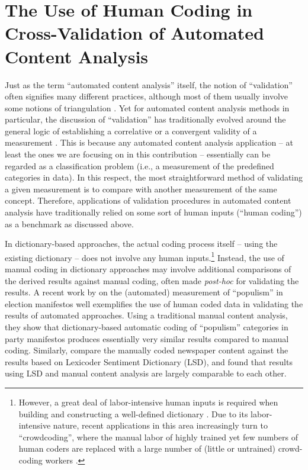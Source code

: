 \documentclass[man, 12pt, a4paper, nolmodern, noextraspace]{apa6}
\begin{document}
\section{The Use of Human Coding in Cross-Validation of Automated Content Analysis}
    
    Just as the term \enquote{automated content analysis} itself, the notion of \enquote{validation} often signifies many different practices, although most of them usually involve some notions of triangulation \parencites{Neunhoeffer2018}. Yet for automated content analysis methods in particular, the discussion of \enquote{validation} has traditionally evolved around the general logic of establishing a correlative or a convergent validity of a measurement \parencites[][]{Krippendorff2008validity}. This is because any automated content analysis application -- at least the ones we are focusing on in this contribution -- essentially can be regarded as a classification problem (i.e., a measurement of the predefined categories in data). In this respect, the most straightforward method of validating a given measurement is to compare with another measurement of the same concept. Therefore, applications of validation procedures in automated content analysis have traditionally relied on some sort of human inputs (“human coding”) as a benchmark as discussed above. 
    
    In dictionary-based approaches, the actual coding process itself -- using the existing dictionary -- does not involve any human inputs.\footnote{However, a great deal of labor-intensive human inputs is required when building and constructing a well-defined dictionary \parencite{YoungSoroka2012, muddiman2018re}. Due to its labor-intensive nature, recent applications in this area increasingly turn to \enquote{crowdcoding}, where the manual labor of highly trained yet few numbers of human coders are replaced with a large number of (little or untrained) crowd-coding workers \parencites[][]{haselmayer2017sentiment, lind2017content}.}  Instead, the use of manual coding in dictionary approaches may involve additional comparisons of the derived results against manual coding, often made \textit{post-hoc} for validating the results. A recent work by \textcite{Rooduijn2011} on the (automated) measurement of \enquote{populism} in election manifestos well exemplifies the use of human coded data in validating the results of automated approaches. Using a traditional manual content analysis, they show that dictionary-based automatic coding of \enquote{populism} categories in party manifestos produces essentially very similar results compared to manual coding. Similarly, \textcite{YoungSoroka2012} compare the manually coded newspaper content against the results based on Lexicoder Sentiment Dictionary (LSD), and found that results using LSD and manual content analysis are largely comparable to each other.
    
\end{document}

